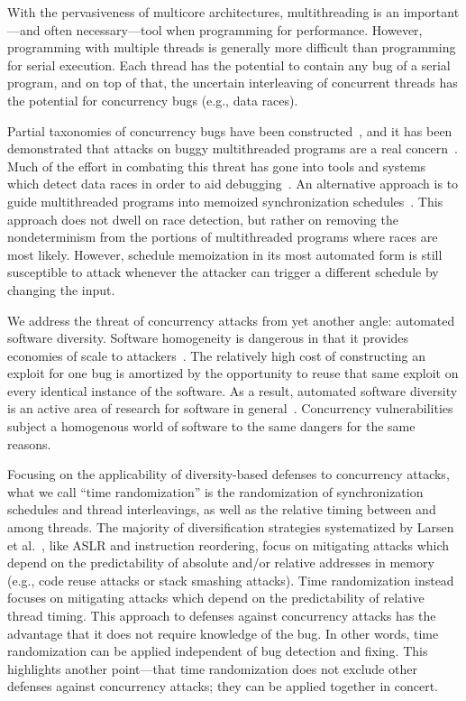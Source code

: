 With the pervasiveness of multicore architectures, multithreading is an
important---and often necessary---tool when programming for performance.
However, programming with multiple threads is generally more difficult than programming for serial execution.
Each thread has the potential to contain any bug of a serial program, and on
top of that, the uncertain interleaving of concurrent threads has the
potential for concurrency bugs (e.g., data races).

Partial taxonomies of concurrency bugs have been constructed~\cite{Farchi2003, Lu2008}, and it has been demonstrated that attacks on buggy multithreaded programs are a real concern~\cite{Yang2012}.
Much of the effort in combating this threat has gone into tools and systems which detect data races in order to aid debugging~\cite{Savage1997, Flanagan2004, Laadan2011, Pratikakis2011, Kasikci2013}.
An alternative approach is to guide multithreaded programs into memoized synchronization schedules~\cite{Cui2010}.
This approach does not dwell on race detection, but rather on removing the nondeterminism from the portions of multithreaded programs where races are most likely.
However, schedule memoization in its most automated form is still susceptible to attack whenever the attacker can trigger a different schedule by changing the input.

We address the threat of concurrency attacks from yet another angle: automated software diversity.
Software homogeneity is dangerous in that it provides economies of scale to attackers~\cite{Geer2003b}.
The relatively high cost of constructing an exploit for one bug is amortized by the opportunity to reuse that same exploit on every identical instance of the software.
As a result, automated software diversity is an active area of research for software in general~\cite{Larsen2014}.
Concurrency vulnerabilities subject a homogenous world of software to the same dangers for the same reasons.

Focusing on the applicability of diversity-based defenses to concurrency attacks, what we call ``time randomization'' is the randomization of synchronization schedules and thread interleavings, as well as the relative timing between and among threads.
The majority of diversification strategies systematized by Larsen et al.~\cite{Larsen2014}, like ASLR and instruction reordering, focus on mitigating attacks which depend on the predictability of absolute and/or relative addresses in memory (e.g., code reuse attacks or stack smashing attacks).
Time randomization instead focuses on mitigating attacks which depend on the predictability of relative thread timing.
This approach to defenses against concurrency attacks has the advantage that it does not require knowledge of the bug.
In other words, time randomization can be applied independent of bug detection and fixing.
This highlights another point---that time randomization does not exclude other defenses against concurrency attacks; they can be applied together in concert.


